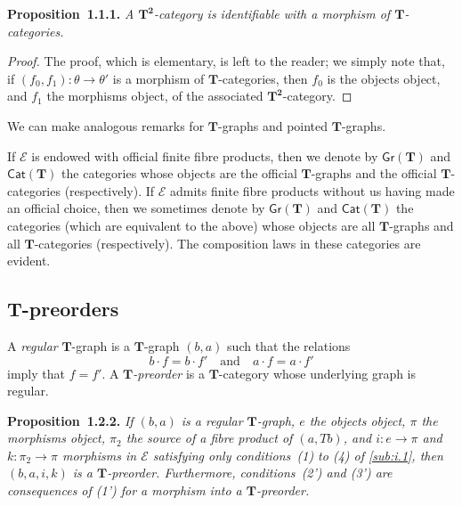 \documentclass{article}
\newenvironment{itenv}[1]
  {\phantomsection\par\medskip\noindent\textbf{#1.}\itshape}
  {\par\medskip}
\newcommand{\oldpage}[1]{\marginpar{\footnotesize$\Big\vert$ \textit{p.~#1}}}
\newcommand{\TT}{\mathbf{T}}
\newcommand{\textand}{\quad\text{and}\quad}
\newcommand{\cat}[1]{\mathcal{#1}}
\newcommand{\Cat}[1]{\mathsf{#1}}
\newcommand{\Gr}[1]{\Cat{Gr}(#1)}
\begin{document}
\begin{itenv}{Proposition~1.1.1}
  A $\TT^\mathbf{2}$-category is identifiable with a morphism of $\TT$-categories.
\end{itenv}

\begin{proof}
  The proof, which is elementary, is left to the reader;
  we simply note that, if $(f_0,f_1)\colon\theta\to\theta'$ is a morphism of $\TT$-categories, then $f_0$ is the objects object, and $f_1$ the morphisms object, of the associated $\TT^\mathbf{2}$-category.
\end{proof}

We can make analogous remarks for $\TT$-graphs and pointed $\TT$-graphs.

\oldpage{229}
If $\cat{E}$ is endowed with official finite fibre products, then we denote by $\Gr{\TT}$ and $\Cat{Cat}(\TT)$ the categories whose objects are the official $\TT$-graphs and the official $\TT$-categories (respectively).
If $\cat{E}$ admits finite fibre products without us having made an official choice, then we sometimes denote by $\Gr{\TT}$ and $\Cat{Cat}(\TT)$ the categories (which are equivalent to the above) whose objects are all $\TT$-graphs and all $\TT$-categories (respectively).
The composition laws in these categories are evident.


\subsection{$\TT$-preorders}
\label{sub:i.2}

A \emph{regular} $\TT$-graph is a $\TT$-graph $(b,a)$ such that the relations
\[
  b\cdot f = b\cdot f'
  \textand
  a\cdot f = a\cdot f'
\]
imply that $f=f'$.
A \emph{$\TT$-preorder} is a $\TT$-category whose underlying graph is regular.

\begin{itenv}{Proposition~1.2.2}
  If $(b,a)$ is a regular $\TT$-graph, $e$ the objects object, $\pi$ the morphisms object, $\pi_2$ the source of a fibre product of $(a,Tb)$, and $i\colon e\to\pi$ and $k\colon\pi_2\to\pi$ morphisms in $\cat{E}$ satisfying only conditions~(1) to (4) of \cref{sub:i.1}, then $(b,a,i,k)$ is a $\TT$-preorder.
  Furthermore, conditions~(2') and (3') are consequences of (1') for a morphism into a $\TT$-preorder.
\end{itenv}
\end{document}
